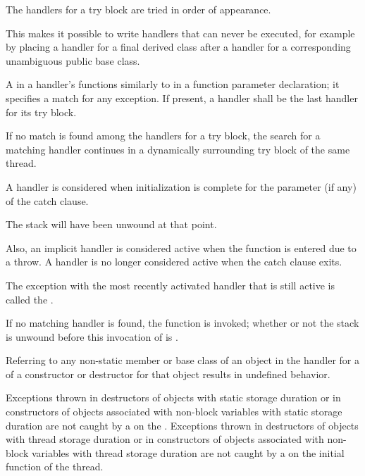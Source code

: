 \pnum
The handlers for a try block are tried in order of appearance.
\begin{note}
This makes it possible to write handlers that can never be
executed, for example by placing a handler for a final derived class after
a handler for a corresponding unambiguous public base class.
\end{note}

\pnum
A
in a handler's
functions similarly to
in a function parameter declaration;
it specifies a match for any exception.
If present, a
handler shall be the last handler for its try block.

\pnum
If no match is found among the handlers for a try block,
the search for a matching
handler continues in a dynamically surrounding try block
of the same thread.

\pnum
A handler is considered  when
initialization is complete for the parameter (if any) of the catch clause.
\begin{note}
The stack will have been unwound at that point.
\end{note}
Also, an implicit handler is considered active when
the function 
is entered due to a throw. A handler is no longer considered active when the
catch clause exits.

\pnum
{}%
The exception with the most recently activated handler that is
still active is called the
.

\pnum
If no matching handler is found,
the function  is invoked;
whether or not the stack is unwound before this invocation of
is .

\pnum
Referring to any non-static member or base class of an object
in the handler for a
of a constructor or destructor for that object results in undefined behavior.

\pnum
Exceptions thrown in destructors of objects with static storage duration or in
constructors of objects associated with non-block variables with static storage duration are not caught by a
on
the .
Exceptions thrown in destructors of objects with thread storage duration or in constructors of objects associated with non-block variables with thread storage duration are not caught by a
on the initial function of the thread.

